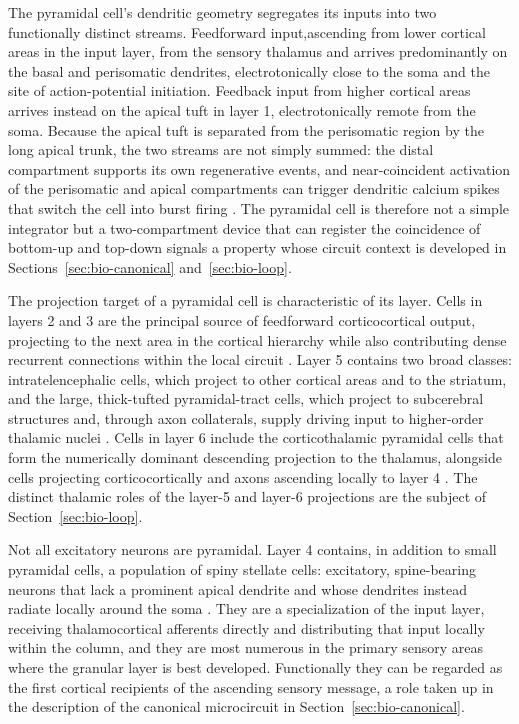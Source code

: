 The pyramidal cell's dendritic geometry segregates its inputs into two functionally distinct streams. Feedforward input,ascending from lower cortical areas in the input layer, from the sensory thalamus and arrives predominantly on the basal and perisomatic dendrites, electrotonically close to the soma and the site of action-potential initiation. Feedback input from higher cortical areas arrives instead on the apical tuft in layer 1, electrotonically remote from the soma. Because the apical tuft is separated from the perisomatic region by the long apical trunk, the two streams are not simply summed: the distal compartment supports its own regenerative events, and near-coincident activation of the perisomatic and apical compartments can trigger dendritic calcium spikes that switch the cell into burst firing \parencite{larkum2013}. The pyramidal cell is therefore not a simple integrator but a two-compartment device that can register the coincidence of bottom-up and top-down signals a property whose circuit context is developed in 
Sections~\ref{sec:bio-canonical} and~\ref{sec:bio-loop}.

The projection target of a pyramidal cell is characteristic of its layer. Cells in layers 2 and 3 are the principal source of feedforward corticocortical output, projecting to the next area in the cortical hierarchy while also contributing dense recurrent connections within the local circuit \parencite{douglas2004}. Layer 5 contains two broad classes: intratelencephalic cells, which project to other cortical areas and to the striatum, and the large, thick-tufted pyramidal-tract cells, which project to subcerebral structures and, through axon collaterals, supply driving input to higher-order thalamic nuclei \parencite{shepherd2018, sherman1998}. Cells in layer 6 include the corticothalamic pyramidal cells that form the numerically dominant descending projection to the thalamus, alongside cells projecting corticocortically and axons ascending locally to layer 4 \parencite{shepherd2018}. The distinct thalamic roles of the layer-5 and layer-6 projections are the subject of Section~\ref{sec:bio-loop}.

Not all excitatory neurons are pyramidal. Layer 4 contains, in addition to small pyramidal cells, a population of spiny stellate cells: excitatory, spine-bearing neurons that lack a prominent apical dendrite and whose dendrites instead radiate locally around the soma \parencite{white1989, douglas2004}. They are a specialization of the input layer, receiving thalamocortical afferents directly and distributing that input locally within the column, and they are most numerous in the primary sensory areas where the granular layer is best developed. Functionally they can be regarded as the first cortical recipients of the ascending sensory message, a role taken up in the description of the canonical microcircuit in Section~\ref{sec:bio-canonical}.

